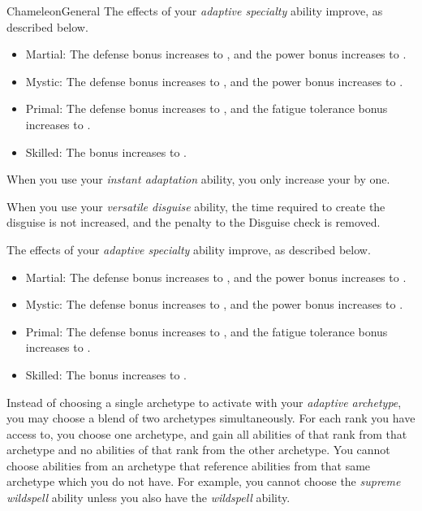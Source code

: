 \begin{feat}{Chameleon}{General}
         The effects of your \textit{adaptive specialty} ability improve, as described below.
        \begin{itemize}
            \item Martial: The defense bonus increases to , and the power bonus increases to .
            \item Mystic: The defense bonus increases to , and the power bonus increases to .
            \item Primal: The defense bonus increases to , and the fatigue tolerance bonus increases to .
            \item Skilled: The bonus increases to .
        \end{itemize}

         When you use your \textit{instant adaptation} ability,
        you only increase your  by one.

         When you use your \textit{versatile disguise} ability, the time required to create the disguise is not increased, and the penalty to the Disguise check is removed.

         The effects of your \textit{adaptive specialty} ability improve, as described below.
        \begin{itemize}
            \item Martial: The defense bonus increases to , and the power bonus increases to .
            \item Mystic: The defense bonus increases to , and the power bonus increases to .
            \item Primal: The defense bonus increases to , and the fatigue tolerance bonus increases to .
            \item Skilled: The bonus increases to .
        \end{itemize}

         Instead of choosing a single archetype to activate with your \textit{adaptive archetype}, you may choose a blend of two archetypes simultaneously.
        For each rank you have access to, you choose one archetype, and gain all abilities of that rank from that archetype and no abilities of that rank from the other archetype.
        You cannot choose abilities from an archetype that reference abilities from that same archetype which you do not have.
        For example, you cannot choose the \textit{supreme wildspell} ability unless you also have the \textit{wildspell} ability.
    \end{feat}

